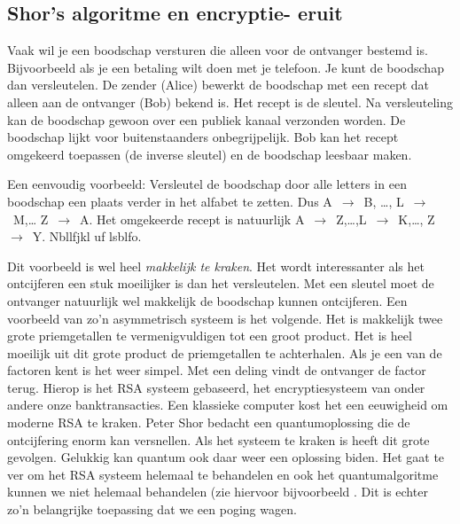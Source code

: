 \documentclass[../main.tex]{subfiles}
\begin{document}
\onlyinsubfile{
}
\notinsubfile{}
%

\subsection*{Shor's algoritme en encryptie- eruit}

Vaak wil je een boodschap versturen die alleen voor de ontvanger bestemd is. Bijvoorbeeld als je een betaling wilt doen met je telefoon. Je kunt de boodschap dan versleutelen. De zender (Alice) bewerkt de boodschap met een recept dat alleen aan de ontvanger (Bob) bekend is. Het recept is de sleutel. Na versleuteling kan de boodschap gewoon over een publiek kanaal verzonden worden. De boodschap lijkt voor buitenstaanders onbegrijpelijk. Bob kan het recept omgekeerd toepassen (de inverse sleutel) en de boodschap leesbaar maken. 

Een eenvoudig voorbeeld: Versleutel de boodschap door alle letters in een boodschap een plaats verder in het alfabet te zetten. Dus A~$\rightarrow$~B, \ldots, L~$\rightarrow$~M,… Z~$\rightarrow$~A. Het omgekeerde recept is natuurlijk A~$\rightarrow$~Z,\ldots,L~$\rightarrow$~K,\ldots, Z~$\rightarrow$~Y. Nbllfjkl uf lsblfo.

Dit voorbeeld is wel heel \textit{makkelijk te kraken}. Het wordt interessanter als het ontcijferen een stuk moeilijker is dan het versleutelen. Met een sleutel moet de ontvanger natuurlijk wel makkelijk de boodschap kunnen ontcijferen. Een voorbeeld van zo'n asymmetrisch systeem is het volgende. Het is makkelijk twee grote priemgetallen te vermenigvuldigen tot een groot product. Het is heel moeilijk uit dit grote product de priemgetallen te achterhalen. Als je een van de factoren kent is het weer simpel. Met een deling vindt de ontvanger de factor terug. Hierop is het RSA systeem gebaseerd, het encryptiesysteem van onder andere onze banktransacties. Een klassieke computer kost het een eeuwigheid om moderne RSA te kraken. Peter Shor bedacht een quantumoplossing die de ontcijfering enorm kan versnellen. Als het systeem te kraken is heeft dit grote gevolgen. Gelukkig kan quantum ook daar weer een oplossing biden. Het gaat te ver om het RSA systeem helemaal te behandelen en ook het quantumalgoritme kunnen we niet helemaal behandelen (zie hiervoor bijvoorbeeld \cite{Veenstra2018}. Dit is echter zo'n belangrijke toepassing dat we een poging wagen.
\end{document}
